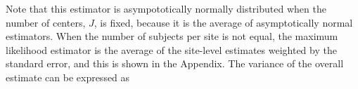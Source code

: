 Note that this estimator is asympototically normally distributed when the number of centers, $J$, is fixed, because it is the average of asymptotically normal estimators. When the number of subjects per site is not equal, the maximum likelihood estimator is the average of the site-level estimates weighted by the standard error, and this is shown in the Appendix. The variance of the overall estimate can be expressed as